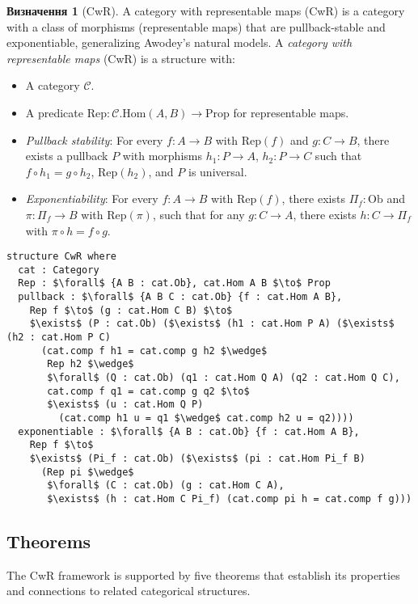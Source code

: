\documentclass{article}
\theoremstyle{definition}
\newtheorem{definition}{Визначення}[section]
\begin{document}
\begin{definition}[CwR]
A category with representable maps (CwR) is a category with a class of
morphisms (representable maps) that are pullback-stable and exponentiable, generalizing Awodey’s natural models.
A \emph{category with representable maps} (CwR) is a structure with:
\begin{itemize}
  \item A category $\mathcal{C}$.
  \item A predicate $\text{Rep} : \mathcal{C}.\text{Hom}(A, B) \to \text{Prop}$ for representable maps.
  \item \emph{Pullback stability}: For every $f : A \to B$ with $\text{Rep}(f)$ and $g : C \to B$, there exists a pullback $P$ with morphisms $h_1 : P \to A$, $h_2 : P \to C$ such that $f \circ h_1 = g \circ h_2$, $\text{Rep}(h_2)$, and $P$ is universal.
  \item \emph{Exponentiability}: For every $f : A \to B$ with $\text{Rep}(f)$, there exists $\Pi_f : \text{Ob}$ and $\pi : \Pi_f \to B$ with $\text{Rep}(\pi)$, such that for any $g : C \to A$, there exists $h : C \to \Pi_f$ with $\pi \circ h = f \circ g$.
\end{itemize}
\end{definition}

\begin{lstlisting}[mathescape=true]
structure CwR where
  cat : Category
  Rep : $\forall$ {A B : cat.Ob}, cat.Hom A B $\to$ Prop
  pullback : $\forall$ {A B C : cat.Ob} {f : cat.Hom A B},
    Rep f $\to$ (g : cat.Hom C B) $\to$
    $\exists$ (P : cat.Ob) ($\exists$ (h1 : cat.Hom P A) ($\exists$ (h2 : cat.Hom P C)
      (cat.comp f h1 = cat.comp g h2 $\wedge$
       Rep h2 $\wedge$
       $\forall$ (Q : cat.Ob) (q1 : cat.Hom Q A) (q2 : cat.Hom Q C),
       cat.comp f q1 = cat.comp g q2 $\to$
       $\exists$ (u : cat.Hom Q P)
         (cat.comp h1 u = q1 $\wedge$ cat.comp h2 u = q2))))
  exponentiable : $\forall$ {A B : cat.Ob} {f : cat.Hom A B},
    Rep f $\to$
    $\exists$ (Pi_f : cat.Ob) ($\exists$ (pi : cat.Hom Pi_f B)
      (Rep pi $\wedge$
       $\forall$ (C : cat.Ob) (g : cat.Hom C A),
       $\exists$ (h : cat.Hom C Pi_f) (cat.comp pi h = cat.comp f g)))
\end{lstlisting}

\newpage
\subsection{Theorems}
The CwR framework is supported by five theorems that establish
its properties and connections to related categorical structures.
\end{document}
